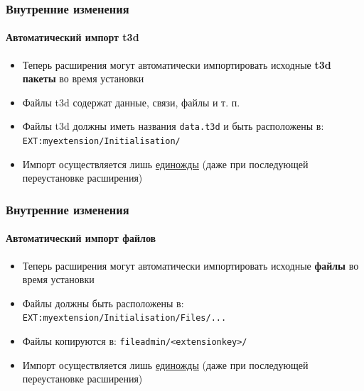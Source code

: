 
\begin{frame}[fragile]
	\frametitle{Внутренние изменения}
	\framesubtitle{Автоматический импорт t3d}

	\begin{itemize}
		\item Теперь расширения могут автоматически импортировать исходные \textbf{t3d пакеты}\newline
			во время установки
		\item Файлы t3d содержат данные, связи, файлы и т. п.
		\item Файлы t3d должны иметь названия \texttt{data.t3d} и быть расположены в:\newline
			\texttt{EXT:myextension/Initialisation/}

		\item Импорт осуществляется лишь \underline{единожды}\newline
			(даже при последующей переустановке расширения)

	\end{itemize}

\end{frame}


\begin{frame}[fragile]
	\frametitle{Внутренние изменения}
	\framesubtitle{Автоматический импорт файлов}

	\begin{itemize}
		\item Теперь расширения могут автоматически импортировать исходные \textbf{файлы}\newline
			во время установки
		\item Файлы должны быть расположены в:\newline
			\texttt{EXT:myextension/Initialisation/Files/...}
		\item Файлы копируются в:\newline
			\texttt{fileadmin/<extensionkey>/}
		\item Импорт осуществляется лишь \underline{единожды}\newline
			(даже при последующей переустановке расширения)

	\end{itemize}

\end{frame}

